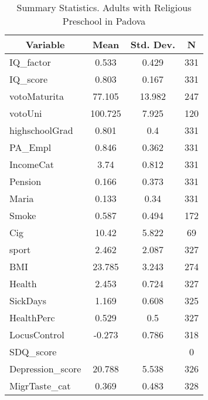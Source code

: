 
\begin{table}[htbp]\centering \caption{Summary Statistics. Adults with Religious Preschool in Padova \label{bothAdultmaternaReliPadova}}
\begin{tabular}{l c c  c}\hline\hline
\multicolumn{1}{c}{\textbf{Variable}} & \textbf{Mean}
 & \textbf{Std. Dev.} & \textbf{N}\\ \hline
IQ\_factor & 0.533 & 0.429  & 331\\
IQ\_score & 0.803 & 0.167  & 331\\
votoMaturita & 77.105 & 13.982  & 247\\
votoUni & 100.725 & 7.925  & 120\\
highschoolGrad & 0.801 & 0.4  & 331\\
PA\_Empl & 0.846 & 0.362  & 331\\
IncomeCat & 3.74 & 0.812  & 331\\
Pension & 0.166 & 0.373  & 331\\
Maria & 0.133 & 0.34  & 331\\
Smoke & 0.587 & 0.494  & 172\\
Cig & 10.42 & 5.822  & 69\\
sport & 2.462 & 2.087  & 327\\
BMI & 23.785 & 3.243  & 274\\
Health & 2.453 & 0.724  & 327\\
SickDays & 1.169 & 0.608  & 325\\
HealthPerc & 0.529 & 0.5  & 327\\
LocusControl & -0.273 & 0.786  & 318\\
SDQ\_score &  &   & 0\\
Depression\_score & 20.788 & 5.538  & 326\\
MigrTaste\_cat & 0.369 & 0.483  & 328\\
\hline\end{tabular}
\end{table}
